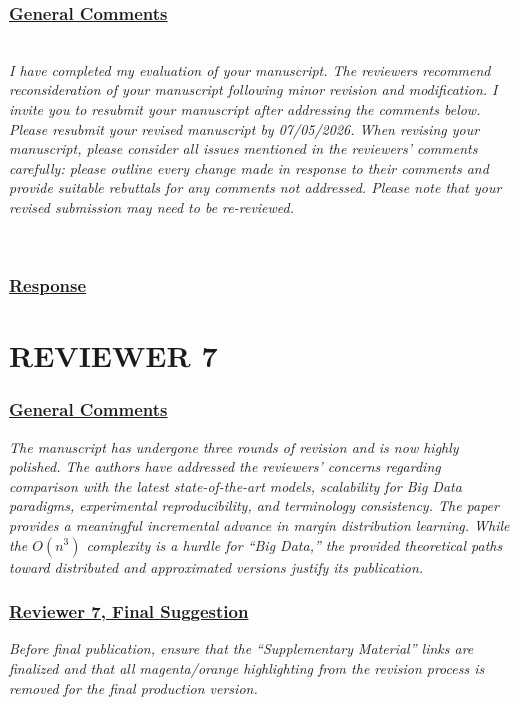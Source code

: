 \documentclass[journal,12pt, onecolumn]{IEEEtran}
\begin{document}
{\color{black}
\subsubsection*{\underline{General Comments}}
\emph{\\
I have completed my evaluation of your manuscript. The reviewers recommend reconsideration of your manuscript following minor revision and modification. I invite you to resubmit your manuscript after addressing the comments below. Please resubmit your revised manuscript by 07/05/2026.
When revising your manuscript, please consider all issues mentioned in the reviewers’ comments carefully: please outline every change made in response to their comments and provide suitable rebuttals for any comments not addressed. Please note that your revised submission may need to be re-reviewed.
}}\\


{\color{black}
\subsubsection*{\textbf{\underline{Response}}}
}

\newpage


{\color{black}
\section*{\textbf{REVIEWER 7}}\label{rev7}}

{\color{black}
\subsubsection*{\underline{General Comments}}
\emph{The manuscript has undergone three rounds of revision and is now highly polished. The authors have addressed the reviewers' concerns regarding comparison with the latest state-of-the-art models, scalability for Big Data paradigms, experimental reproducibility, and terminology consistency. The paper provides a meaningful incremental advance in margin distribution learning. While the $O(n^3)$ complexity is a hurdle for ``Big Data,'' the provided theoretical paths toward distributed and approximated versions justify its publication.}
}


{\color{customgreen}
\subsubsection*{\underline{\textbf{Reviewer 7, Final Suggestion}}}
\emph{Before final publication, ensure that the ``Supplementary Material'' links are finalized and that all magenta/orange highlighting from the revision process is removed for the final production version.}
}
\end{document}
